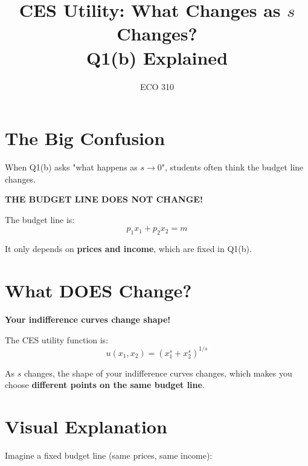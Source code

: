 \documentclass[12pt]{article}
\title{\LARGE CES Utility: What Changes as $s$ Changes?\\Q1(b) Explained}
\author{ECO 310}
\date{}
\begin{document}
\maketitle

\section*{The Big Confusion}

When Q1(b) asks "what happens as $s \to 0$", students often think the budget line changes.

\begin{center}
\colorbox{red!20}{
\Large
\textbf{THE BUDGET LINE DOES NOT CHANGE!}
}
\end{center}

\vspace{1em}

The budget line is:
$$p_1 x_1 + p_2 x_2 = m$$

It only depends on \textbf{prices and income}, which are fixed in Q1(b).

\section*{What DOES Change?}

\begin{center}
\colorbox{green!20}{
\Large
\textbf{Your indifference curves change shape!}
}
\end{center}

The CES utility function is:
$$u(x_1, x_2) = (x_1^s + x_2^s)^{1/s}$$

As $s$ changes, the shape of your indifference curves changes, which makes you choose \textbf{different points on the same budget line}.

\section*{Visual Explanation}

Imagine a fixed budget line (same prices, same income):
\end{document}

